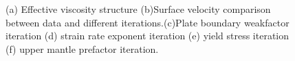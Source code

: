 \documentclass[12pt]{article}
\begin{document}
\begin{figure}[H]
{}
\hspace{-0.2cm}
\caption{(a) Effective viscosity structure (b)Surface velocity comparison between data and different iterations.(c)Plate boundary weakfactor iteration (d) strain rate exponent iteration (e) yield stress iteration (f) upper mantle prefactor iteration.}
\label{fig:inverse1}
\end{figure}


\end{document}
